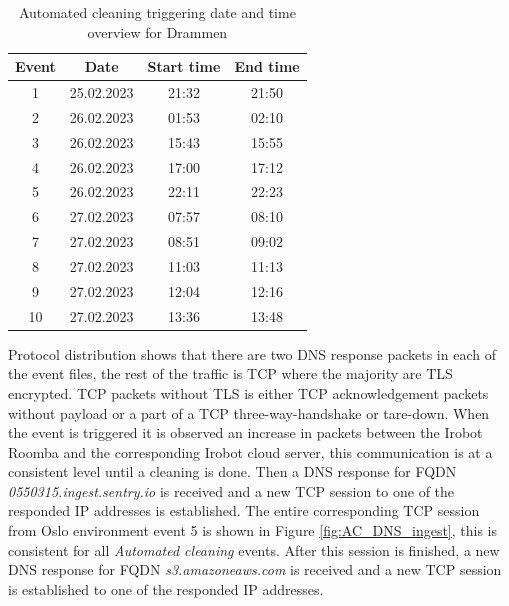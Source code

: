  \begin{table}[H]
\centering
\caption{Automated cleaning triggering date and time overview for Drammen}
\label{tab:AC_dateandtimeDrammen}
\begin{tabular}{|c|c|c|c|}
\hline
\textbf{Event} & \textbf{Date} & \textbf{Start time} & \textbf{End time} \\ \hline
1              & 25.02.2023         & 21:32               & 21:50             \\ \hline
2              & 26.02.2023         & 01:53               & 02:10             \\ \hline
3              & 26.02.2023         & 15:43               & 15:55             \\ \hline
4              & 26.02.2023         & 17:00               & 17:12             \\ \hline
5              & 26.02.2023         & 22:11               & 22:23             \\ \hline
6              & 27.02.2023         & 07:57               & 08:10             \\ \hline
7              & 27.02.2023         & 08:51               & 09:02             \\ \hline
8              & 27.02.2023         & 11:03               & 11:13             \\ \hline
9              & 27.02.2023         & 12:04               & 12:16             \\ \hline
10             & 27.02.2023         & 13:36               & 13:48             \\ \hline
\end{tabular}
\end{table}

Protocol distribution shows that there are two \gls{DNS} response packets in each of the event files, the rest of the traffic is \gls{TCP} where the majority are \gls{TLS} encrypted. \gls{TCP} packets without \gls{TLS} is either \gls{TCP} acknowledgement packets without payload or a part of a \gls{TCP} three-way-handshake or tare-down. When the event is triggered it is observed an increase in packets between the Irobot Roomba and the corresponding Irobot cloud server, this communication is at a consistent level until a cleaning is done. Then a \gls{DNS} response for \gls{FQDN} \textit{0550315.ingest.sentry.io} is received and a new \gls{TCP} session to one of the responded \gls{IP} addresses is established. The entire corresponding \gls{TCP} session from Oslo environment event 5 is shown in Figure \ref{fig:AC_DNS_ingest}, this is consistent for all \textit{Automated cleaning} events. After this session is finished, a new \gls{DNS} response for \gls{FQDN} \textit{s3.amazoneaws.com} is received and a new \gls{TCP} session is established to one of the responded \gls{IP} addresses.  

